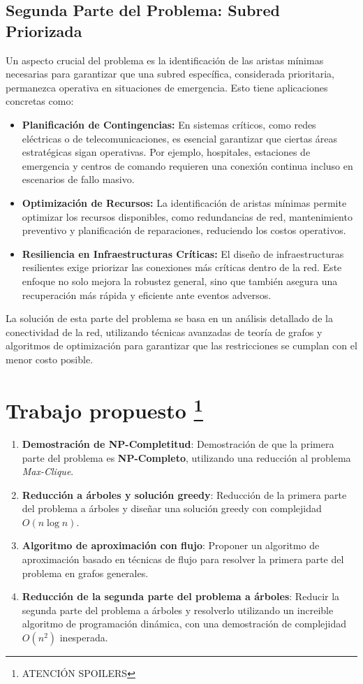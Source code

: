 \documentclass[a4paper, 12pt]{article}
\begin{document}
\subsection*{Segunda Parte del Problema: Subred Priorizada}
Un aspecto crucial del problema es la identificación de las aristas mínimas necesarias para garantizar que una subred específica, considerada prioritaria, permanezca operativa en situaciones de emergencia. Esto tiene aplicaciones concretas como:
\begin{itemize}
    \item \textbf{Planificación de Contingencias:} En sistemas críticos, como redes eléctricas o de telecomunicaciones, es esencial garantizar que ciertas áreas estratégicas sigan operativas. Por ejemplo, hospitales, estaciones de emergencia y centros de comando requieren una conexión continua incluso en escenarios de fallo masivo.
    \item \textbf{Optimización de Recursos:} La identificación de aristas mínimas permite optimizar los recursos disponibles, como redundancias de red, mantenimiento preventivo y planificación de reparaciones, reduciendo los costos operativos.
    \item \textbf{Resiliencia en Infraestructuras Críticas:} El diseño de infraestructuras resilientes exige priorizar las conexiones más críticas dentro de la red. Este enfoque no solo mejora la robustez general, sino que también asegura una recuperación más rápida y eficiente ante eventos adversos.
\end{itemize}

La solución de esta parte del problema se basa en un análisis detallado de la conectividad de la red, utilizando técnicas avanzadas de teoría de grafos y algoritmos de optimización para garantizar que las restricciones se cumplan con el menor costo posible.


\section*{Trabajo propuesto \footnote{ATENCIÓN SPOILERS}}
\begin{enumerate}
    \item \textbf{Demostración de NP-Completitud}: 
    Demostración de que la primera parte del problema es \textbf{NP-Completo}, utilizando una reducción al problema \textit{Max-Clique}.
    \item \textbf{Reducción a árboles y solución greedy}: 
    Reducción de la primera parte del problema a árboles y diseñar una solución greedy con complejidad \( O(n \log n) \).
    \item \textbf{Algoritmo de aproximación con flujo}: 
    Proponer un algoritmo de aproximación basado en técnicas de flujo para resolver la primera parte del problema en grafos generales.
    \item \textbf{Reducción de la segunda parte del problema a árboles}: 
    Reducir la segunda parte del problema a árboles y resolverlo utilizando un increible algoritmo de programación dinámica, con una demostración de complejidad \( O(n^2) \) inesperada.
\end{enumerate}
\end{document}
